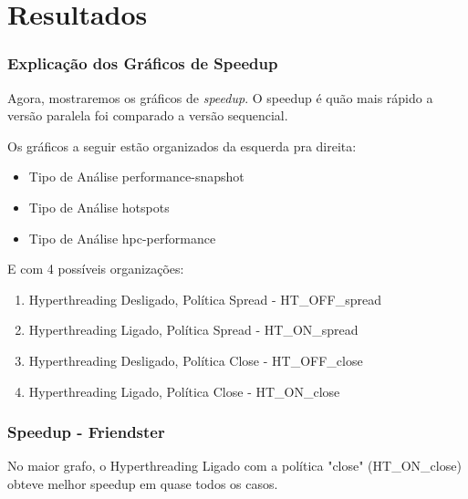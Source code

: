 \documentclass{beamer}
\begin{document}
\section{Resultados}

\begin{frame}
    \frametitle{Explicação dos Gráficos de Speedup}
        Agora, mostraremos os gráficos de \textit{speedup}.
        O speedup é quão mais rápido a versão paralela foi comparado a versão sequencial. 
        
        Os gráficos a seguir estão organizados da esquerda pra direita:
        \begin{itemize}
            \item Tipo de Análise performance-snapshot
            \item Tipo de Análise hotspots
            \item Tipo de Análise hpc-performance
        \end{itemize}

        E com 4 possíveis organizações:
        \begin{enumerate}
            \item Hyperthreading Desligado, Política Spread - HT\_OFF\_spread
            \item Hyperthreading Ligado, Política Spread - HT\_ON\_spread
            \item Hyperthreading Desligado, Política Close - HT\_OFF\_close
            \item Hyperthreading Ligado, Política Close - HT\_ON\_close
        \end{enumerate}
\end{frame}

\begin{frame}
    \frametitle{Speedup - Friendster}

    \begin{figure}
        \centering
    \end{figure}
    \centering
    No maior grafo, o Hyperthreading Ligado com a política "close" (HT\_ON\_close) obteve melhor speedup em quase todos os casos.
\end{frame}
\end{document}

